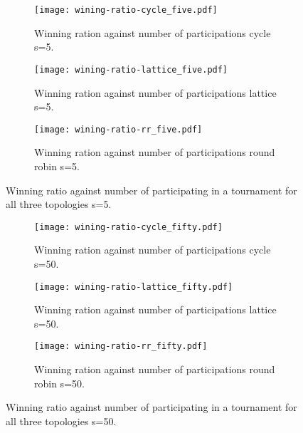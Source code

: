 \begin{figure}[!hbtp]
\centering

    \begin{subfigure}[t]{1\textwidth}
    \centering
        \texttt{[image: wining-ratio-cycle\_five.pdf]}
    \caption{Winning ration against number of participations cycle s=5.}
    \end{subfigure}
\hfill
    \begin{subfigure}[t]{1\textwidth}\centering
    \centering
        \texttt{[image: wining-ratio-lattice\_five.pdf]}
    \caption{Winning ration against number of participations lattice s=5.}
    \end{subfigure}
\hfill
    \begin{subfigure}[t]{1\textwidth}\centering
    \centering
        \texttt{[image: wining-ratio-rr\_five.pdf]}
    \caption{Winning ration against number of participations round robin s=5.}
    \end{subfigure}
\caption{Winning ratio against number of participating in a tournament
         for all three topologies s=5.}
\label{fig:winning-ratio-five}
\end{figure}

\begin{figure}[H]
\centering
    \begin{subfigure}[t]{1\textwidth}
    \centering
        \texttt{[image: wining-ratio-cycle\_fifty.pdf]}
    \caption{Winning ration against number of participations cycle s=50.}
    \end{subfigure}
\hfill
    \begin{subfigure}[t]{1\textwidth}\centering
    \centering
        \texttt{[image: wining-ratio-lattice\_fifty.pdf]}
    \caption{Winning ration against number of participations lattice s=50.}
    \end{subfigure}
\hfill
    \begin{subfigure}[t]{1\textwidth}\centering
    \centering
        \texttt{[image: wining-ratio-rr\_fifty.pdf]}
    \caption{Winning ration against number of participations round robin s=50.}
    \end{subfigure}
\caption{Winning ratio against number of participating in a tournament
             for all three topologies s=50.}
\label{fig:winning-ratio-fifty}
\end{figure}


